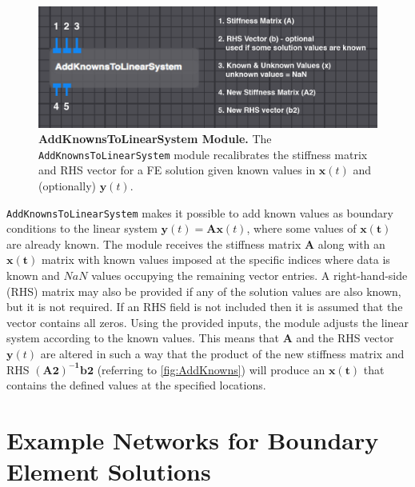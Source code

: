 \begin{figure}[b]
\begin{center}
\includegraphics[width=\textwidth]{ECGToolkitGuide_figures/AddKnowns.png}
\caption{{\bf AddKnownsToLinearSystem Module.} The {\tt AddKnownsToLinearSystem} module recalibrates  the stiffness matrix and RHS vector for a FE solution given known values in $\mathbf{x}(t)$ and (optionally) $\mathbf{y}(t)$.}
\label{fig:AddKnowns}
\end{center}
\vspace{-.25 in}
\end{figure}

{\tt AddKnownsToLinearSystem} makes it possible to add known values as boundary conditions
to the linear system $\mathbf{y}(t) = \mathbf{A}\mathbf{x}(t)$, where some values of
$\mathbf{x(t)}$ are already known.
The module receives the stiffness matrix $\mathbf{A}$ along with an $\mathbf{x(t)}$ matrix with known values imposed at the specific indices where data is known and $NaN$ values occupying the remaining vector entries.
A right-hand-side (RHS) matrix may also be provided if any of the solution values are also known, but it is not required.
If an RHS field is not included then it is assumed that the vector contains all zeros. %
Using the provided inputs, the module adjusts the linear system according to the known values.
This means that $\mathbf{A}$ and the RHS vector $\mathbf{y}(t)$ are altered in such a way that the product of the new stiffness matrix and RHS $\mathbf{(A2)^{-1}} \mathbf{b2}$ (referring to \autoref{fig:AddKnowns}) will produce an $\mathbf{x(t)}$ that contains the defined values at the specified locations.

\section{Example Networks for Boundary Element Solutions}

